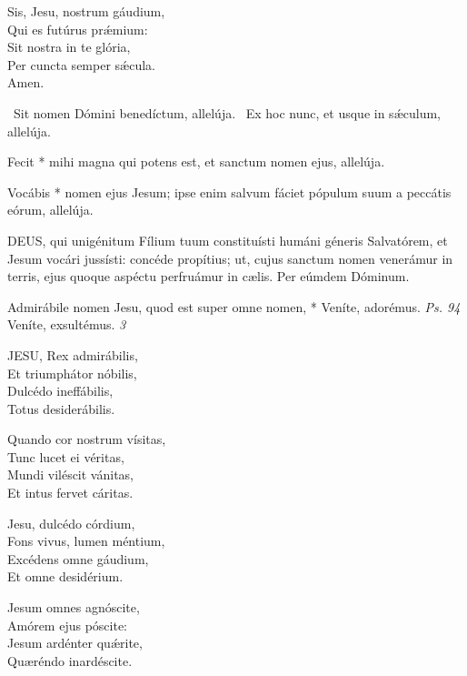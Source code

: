 
Sis, Jesu, nostrum gáudium,\\
Qui es futúrus prǽmium:\\
Sit nostra in te glória,\\
Per cuncta semper sǽcula.\\
Amen.

\V\ Sit nomen Dómini benedíctum, allelúja. \R\ Ex hoc nunc, et usque in sǽculum, allelúja.

 Fecit * mihi magna qui potens est, et sanctum nomen ejus, allelúja.


 Vocábis * nomen ejus Jesum; ipse enim salvum fáciet pópulum suum a peccátis eórum, allelúja.


\lettrine[lines=2]{D}{EUS}, qui unigénitum Fílium tuum constituísti humáni géneris Salvatórem, et Jesum vocári jussísti: concéde propítius; ut, cujus sanctum nomen venerámur in terris, ejus quoque aspéctu perfruámur in cælis. Per eúmdem Dóminum.




 Admirábile nomen Jesu, quod est super omne nomen, * Veníte, adorémus. \textit{Ps. 94} Veníte, exsultémus. \textit{3}


\lettrine[lines=2]{J}{ESU}, Rex admirábilis,\\
Et triumphátor nóbilis,\\
Dulcédo ineffábilis,\\
Totus desiderábilis.

Quando cor nostrum vísitas,\\
Tunc lucet ei véritas,\\
Mundi viléscit vánitas,\\
Et intus fervet cáritas.

Jesu, dulcédo córdium,\\
Fons vivus, lumen méntium,\\
Excédens omne gáudium,\\
Et omne desidérium.

Jesum omnes agnóscite,\\
Amórem ejus póscite:\\
Jesum ardénter quǽrite,\\
Quæréndo inardéscite.

